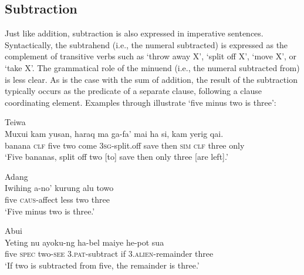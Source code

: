  

  

\subsection{Subtraction}
\label{sec:8:Subtraction}
Just like addition, subtraction is also expressed in imperative sentences. Syntactically, the subtrahend (i.e., the numeral subtracted) is expressed as the complement of transitive verbs such as `throw away X', `split off X', `move X', or `take X'. The grammatical role of the minuend (i.e., the numeral subtracted from) is less clear. As is the case with the sum of addition, the result of the subtraction typically occurs as the predicate of a separate clause, following a clause coordinating element. Examples  through  illustrate `five minus two is three':


 

\ea
\label{ex:8:1240}
{\upshape Teiwa}\\
 \gll Muxui  kam  yusan,     haraq  ma  ga-fa'   mai   ha  si,{\hspace{2cm}}  kam  yerig   qai.      \\
    banana  \textsc{clf}  five   two  come  \textsc{3sg-}split.off  save  then  \textsc{sim}  \textsc{clf} three  only    \\
 \glt `Five bananas,    split off two [to] save then only three [are left].' 
\z
 
\ea
\label{ex:8:1241}
{\upshape Adang}\\ 
\gll Iwihing  a-no'   kurung  alu  towo\\
 five  \textsc{caus}{}-affect  less  two  three\\
\glt `Five minus two is three.' 
\z  


\ea
\label{ex:8:1242}
{\upshape Abui}\\
 \gll Yeting  nu  ayoku-ng  ha-bel  maiye  he-pot  sua\\
  five  \textsc{spec}   two-\textsc{see } 3.\textsc{pat}{}-subtract  if  \textsc{3.alien}{}-remainder  three \\
 \glt `If two is subtracted from five, the remainder is three.' 
\z 
  
